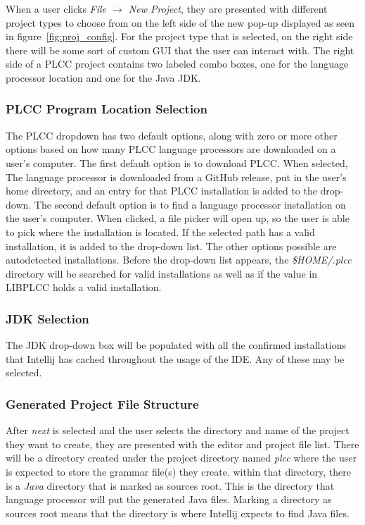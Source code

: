 \documentclass[conference, letterpaper]{IEEEtran}
\begin{document}
When a user clicks \textit{File $\rightarrow$ New Project}, they are presented with different project types to choose from on the left side of the new pop-up displayed as seen in figure~\ref{fig:proj_config}.
For the project type that is selected, on the right side there will be some sort of custom GUI that the user can interact with.
The right side of a PLCC project contains two labeled combo boxes, one for the language processor location and one for the Java JDK.

\subsubsection{PLCC Program Location Selection}\label{subsubsec:plcc-program-location}
The PLCC dropdown has two default options, along with zero or more other options based on how many PLCC language processors are downloaded on a user's computer.
The first default option is to download PLCC\@.
When selected, The language processor is downloaded from a GitHub release, put in the user's home directory, and an entry for that PLCC installation is added to the drop-down.
The second default option is to find a language processor installation on the user's computer.
When clicked, a file picker will open up, so the user is able to pick where the installation is located.
If the selected path has a valid installation, it is added to the drop-down list.
The other options possible are autodetected installations.
Before the drop-down list appears, the \textit{\$HOME/.plcc} directory will be searched for valid installations as well as if the value in LIBPLCC holds a valid installation.

\subsubsection{JDK Selection}\label{subsubsec:jdk-installation}
The JDK drop-down box will be populated with all the confirmed installations that Intellij has cached throughout the usage of the IDE. Any of these may be selected.

\subsubsection{Generated Project File Structure}\label{subsubsec:generated-project-file-structure}
After \textit{next} is selected and the user selects the directory and name of the project they want to create, they are presented with the editor and project file list.
There will be a directory created under the project directory named \textit{plcc} where the user is expected to store the grammar file(s) they create.
within that directory, there is a \textit{Java} directory that is marked as sources root.
This is the directory that language processor will put the generated Java files.
Marking a directory as sources root means that the directory is where Intellij expects to find Java files.
\end{document}
